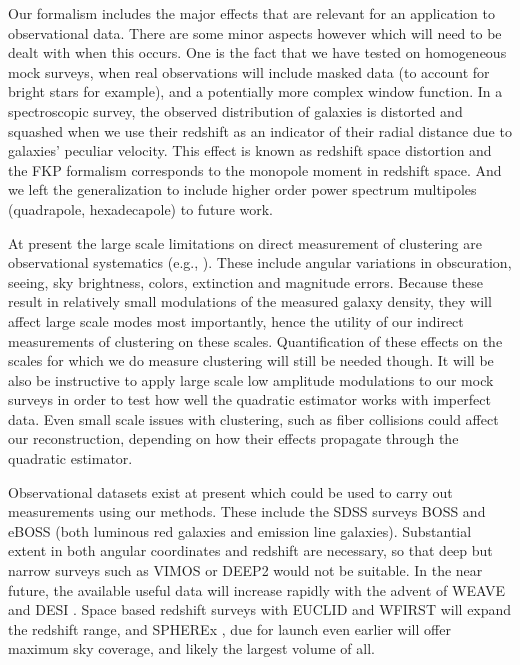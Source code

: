 \documentclass[prd,amsmath,amssymb,floatfix,superscriptaddress,nofootinbib,twocolumn]{revtex4-1}
\begin{document}
Our formalism includes the major effects that are relevant for an application to observational data. There are some minor aspects however which will need to be dealt with when this occurs. One is the fact that we have tested on homogeneous mock surveys, when real observations will include masked data (to account for bright stars for example), and a potentially more complex window function. In a spectroscopic survey, the observed distribution of galaxies is distorted and squashed when we use their redshift as an indicator of their radial distance due to galaxies' peculiar velocity. This effect is known as redshift space distortion \cite{Kaiser:1987rsd} and the FKP formalism corresponds to the monopole moment in redshift space. And we left the generalization to include higher order power spectrum multipoles (quadrapole, hexadecapole) to future work.

At present the large scale limitations on direct measurement of clustering are observational systematics (e.g., \cite{Ho:2012sh}). These include angular variations in obscuration, seeing, sky brightness, colors, extinction and magnitude errors. Because these result in relatively small modulations of the measured galaxy density, they will affect large scale modes most importantly, hence the utility of our indirect measurements of clustering on these scales. Quantification of these effects on the scales for which we do measure clustering will still be needed though. It will be also be instructive to apply large scale low amplitude modulations to our mock surveys in order to test how well the quadratic estimator works with imperfect data. Even small scale issues with clustering, such as fiber collisions \cite{Hahn:2016kiy} could affect our reconstruction, depending on how their effects propagate through the quadratic estimator.

Observational datasets exist at present which could be used to carry out measurements using our methods. These include the SDSS surveys BOSS \cite{Dawson:2013boss} and eBOSS \cite{Dawson:2015wdb} (both luminous red galaxies and emission line galaxies). Substantial extent in both angular coordinates and redshift are necessary, so that deep but narrow surveys such as VIMOS \cite{Fevre:2014tna} or DEEP2 \cite{Coil:2005ap} would not be suitable. In the near future, the available useful data will increase rapidly with the advent of WEAVE \cite{Dalton:2014wv} and DESI \cite{DESI:2019ds}. Space based redshift surveys  with EUCLID \cite{Amiaux:2012ec} and WFIRST \cite{Wfirst:2012jg} will expand the redshift range, and SPHEREx \cite{Dore:2014cca}, due for launch even earlier will offer maximum sky coverage, and likely the largest volume of all.
\end{document}
